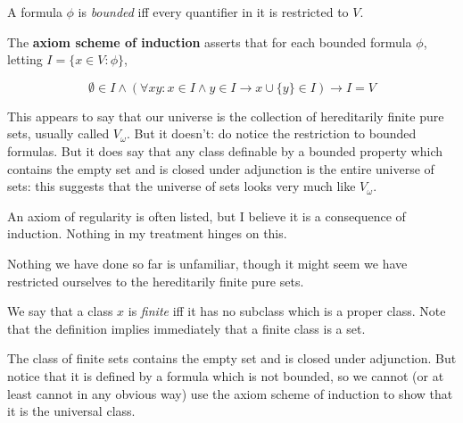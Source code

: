 \documentclass{slides}
\begin{document}
\begin{slide}

A formula $\phi$ is {\em bounded\/} iff every quantifier in it is restricted to $V$.

The {\bf axiom scheme of induction\/} asserts that for each bounded formula $\phi$, \newline letting $I = \{x \in V:\phi\}$,

$$\emptyset \in I \wedge (\forall xy:x \in I \wedge y \in I \rightarrow x \cup \{y\} \in I) \rightarrow I = V$$

This appears to say that our universe is the collection of hereditarily finite pure sets, usually called $V_\omega$.  But it doesn't:  do notice the restriction to bounded formulas.  But it does say that any class definable by a bounded property which contains the empty set and is closed under adjunction is the entire universe of sets:  this suggests that the universe of sets looks very much like $V_\omega$.

\end{slide}

\begin{slide}

An axiom of regularity is often listed, but I believe it is a consequence of induction.  Nothing in my treatment hinges on this.

\end{slide}

\begin{slide}

Nothing we have done so far is unfamiliar, though it might seem we have restricted ourselves to the hereditarily finite pure sets.

We say that a class $x$ is {\em finite\/} iff it has no subclass which is a proper class.  Note that the definition implies immediately that a finite class is a set.

The class of finite sets contains the empty set and is closed under adjunction.  But notice that it is defined by
a formula which is not bounded, so we cannot (or at least cannot in any obvious way) use the axiom scheme of induction to show that it is the universal class.


\end{slide}
\end{document}
